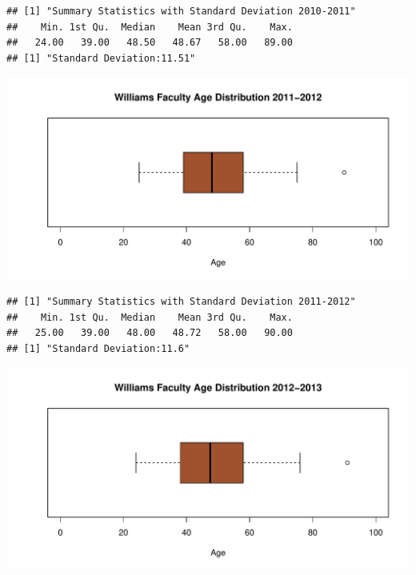 \documentclass[12pt,a4paper]{article}\usepackage[]{graphicx}\usepackage[]{color}
\makeatletter
\def\maxwidth{ %
  \ifdim\Gin@nat@width>\linewidth
    \linewidth
  \else
    \Gin@nat@width
  \fi
}
\newenvironment{kframe}{%
 \def\at@end@of@kframe{}%
 \ifinner\ifhmode%
  \def\at@end@of@kframe{\end{minipage}}%
  \begin{minipage}{\columnwidth}%
 \fi\fi%
 \def\FrameCommand##1{\hskip\@totalleftmargin \hskip-\fboxsep
 \colorbox{shadecolor}{##1}\hskip-\fboxsep
     \hskip-\linewidth \hskip-\@totalleftmargin \hskip\columnwidth}%
 \MakeFramed {\advance\hsize-\width
   \@totalleftmargin\z@ \linewidth\hsize
   \@setminipage}}%
 {\par\unskip\endMakeFramed%
 \at@end@of@kframe}
\newenvironment{knitrout}{}{} %
\theoremstyle{definition}
\makeatother
\begin{document}
\begin{knitrout}
\color{fgcolor}\begin{kframe}
\begin{verbatim}
## [1] "Summary Statistics with Standard Deviation 2010-2011"
##    Min. 1st Qu.  Median    Mean 3rd Qu.    Max. 
##   24.00   39.00   48.50   48.67   58.00   89.00
## [1] "Standard Deviation:11.51"
\end{verbatim}
\end{kframe}
\end{knitrout}

\begin{knitrout}
\color{fgcolor}
\includegraphics[width=\maxwidth]{figure/unnamed-chunk-28-1} 

\end{knitrout}

\begin{knitrout}
\color{fgcolor}\begin{kframe}
\begin{verbatim}
## [1] "Summary Statistics with Standard Deviation 2011-2012"
##    Min. 1st Qu.  Median    Mean 3rd Qu.    Max. 
##   25.00   39.00   48.00   48.72   58.00   90.00
## [1] "Standard Deviation:11.6"
\end{verbatim}
\end{kframe}
\end{knitrout}



\begin{knitrout}
\color{fgcolor}
\includegraphics[width=\maxwidth]{figure/unnamed-chunk-30-1} 

\end{knitrout}
\end{document}
